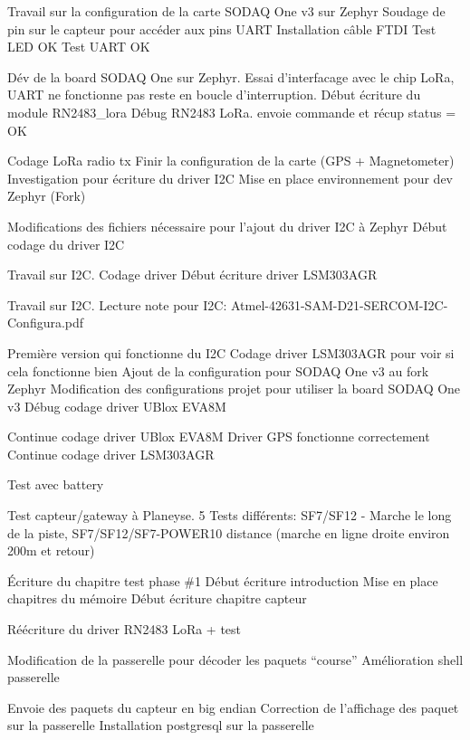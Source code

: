 \begin{multicols}{2}
Travail sur la configuration de la carte SODAQ One v3 sur Zephyr
Soudage de pin sur le capteur pour accéder aux pins UART
Installation câble FTDI
Test LED OK
Test UART OK

Dév de la board SODAQ One sur Zephyr.
Essai d’interfacage avec le chip LoRa, UART ne fonctionne pas reste en boucle d’interruption.
Début écriture du module RN2483\_lora
Débug RN2483 LoRa. envoie commande et récup status = OK

Codage LoRa radio tx
Finir la configuration de la carte (GPS + Magnetometer)
Investigation pour écriture du driver I2C
Mise en place environnement pour dev Zephyr (Fork)

Modifications des fichiers nécessaire pour l’ajout du driver I2C à Zephyr
Début codage du driver I2C

Travail sur I2C. Codage driver
Début écriture driver LSM303AGR

Travail sur I2C. 
Lecture note pour I2C: Atmel-42631-SAM-D21-SERCOM-I2C-Configura.pdf

Première version qui fonctionne du I2C
Codage driver LSM303AGR pour voir si cela fonctionne bien
Ajout de la configuration pour SODAQ One v3 au fork Zephyr
Modification des configurations projet pour utiliser la board SODAQ One v3
Débug codage driver UBlox EVA8M

Continue codage driver UBlox EVA8M
Driver GPS fonctionne correctement
Continue codage driver LSM303AGR

Test avec battery

Test capteur/gateway à Planeyse. 
5 Tests différents: SF7/SF12 - Marche le long de la piste, SF7/SF12/SF7-POWER10 distance (marche en ligne droite environ 200m et retour)

Écriture du chapitre test phase \#1
Début écriture introduction
Mise en place chapitres du mémoire
Début écriture chapitre capteur

Réécriture du driver RN2483 LoRa + test

Modification de la passerelle pour décoder les paquets “course”
Amélioration shell passerelle

Envoie des paquets du capteur en big endian
Correction de l’affichage des paquet sur la passerelle
Installation postgresql sur la passerelle


\end{multicols}
